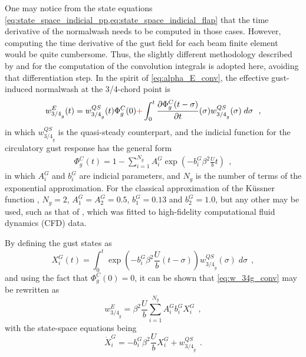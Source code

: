 \documentclass[12pt,a4paper,oneside,english]{abntex2} %
\newcommand{\fix}[1]{{\color{red}#1}}
\newcommand{\del}[2]{\frac{\partial#1}{\partial#2}}
\def\lp{\left(}
\def\rp{\right)}
\begin{document}
One may notice from the state equations \cref{eq:state_space_indicial_pp,eq:state_space_indicial_flap} that the time derivative of the normalwash needs to be computed in those cases. However, computing the time derivative of the gust field for each beam finite element would be quite cumbersome. Thus, the slightly different methodology described by  and  for the computation of the convolution integrals is adopted here, avoiding that differentiation step. In the spirit of \cref{eq:alpha_E_conv}, the effective gust-induced normalwash at the 3/4-chord point is
\begin{equation}
    w_{{3/4}_g}^E(t) = w_{{3/4}_g}^{QS}(t)\Phi_g^C(0) \fix{+} \int_0^t \del{\Phi_g^C(t-\sigma)}{t}(\sigma) w_{{3/4}_g}^{QS}(\sigma) \;d\sigma \ \ ,
    \label{eq:w_34g_conv}
\end{equation}
in which $w_{{3/4}_g}^{QS}$ is the quasi-steady counterpart, and the indicial function for the circulatory gust response has the general form
\begin{align}
    \Phi_g^C(t) = 1-\sum_{i=1}^{N_g}A_i^G\exp{\lp-b_i^G\beta^2\frac{U}{b}t\rp}  \ \ , \label{eq:Phi_gC} 
\end{align}
in which $A_i^G$ and $b_i^G$ are indicial parameters, and $N_g$ is the number of terms of the exponential approximation. For the classical approximation of the K\"{u}ssner function \cite{leishman2006principles}, $N_g=2$, $A_1^G=A_2^G=0.5$, $b_1^G=0.13$ and $b_2^G=1.0$, but any other may be used, such as that of , which was fitted to high-fidelity computational fluid dynamics (CFD) data.

By defining the gust states as
\begin{equation}
    X_i^G(t) = \int_0^t \exp{\lp-b_i^G\beta^2\frac{U}{b}(t-\sigma)\rp} w_{{3/4}_g}^{QS}(\sigma) \; d\sigma \ \ ,
    \label{eq:gust_states} 
\end{equation}
and using the fact that $\Phi_g^C(0)=0$, it can be shown that \cref{eq:w_34g_conv} may be rewritten as
\begin{equation}
    w_{{3/4}_g}^E = \beta^2\frac{U}{b}\sum_{i=1}^{N_g} A_i^G b_i^G X_i^G \ \ ,
    \label{eq:w_34g_E} 
\end{equation}
with the state-space equations being
\begin{equation}
    \dot{X}_i^G = -b_i^G\beta^2\frac{U}{b}X_i^G + w_{{3/4}_g}^{QS} \ \ .
    \label{eq:state_space_gust} 
\end{equation}
\end{document}
